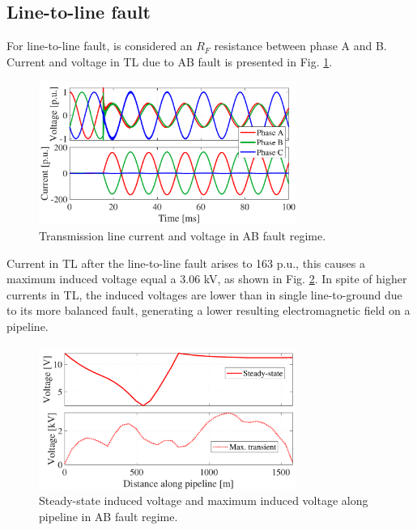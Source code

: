 \documentclass[5p,twocolumn]{elsarticle}
\begin{document}
\subsection{Line-to-line fault}

For line-to-line fault, is considered an $R_{F}$ resistance between phase A and B. Current and voltage in TL due to AB fault is presented in Fig. \ref{fig:ABindVoltageTL}.

\begin{figure}[h]
	\begin{center}
		\includegraphics[width=8.4cm]{img/ABindVoltage_TL.pdf}    %
		\caption{Transmission line current and voltage in AB fault regime.} 
		\label{fig:ABindVoltageTL}
	\end{center}
\end{figure}

Current in TL after the line-to-line fault arises to 163 p.u., this causes a maximum induced voltage equal a 3.06 kV, as shown in Fig. \ref{fig:ABindVoltage}. In spite of higher currents in TL, the induced voltages are lower than in single line-to-ground due to its more balanced fault, generating a lower resulting electromagnetic field on a pipeline.   

\begin{figure}[h]
	\begin{center}
		\includegraphics[width=8.4cm]{img/ABindVoltage.pdf}    %
		\caption{Steady-state induced voltage and maximum induced voltage along pipeline in AB fault regime.} 
		\label{fig:ABindVoltage}
	\end{center}
\end{figure}
\end{document}
